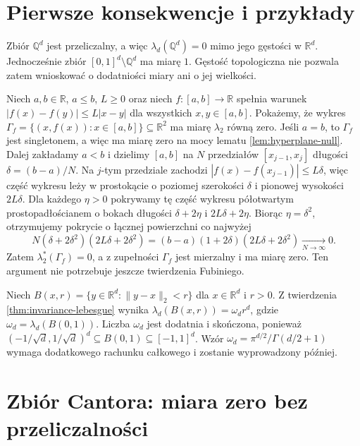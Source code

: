 \section{Pierwsze konsekwencje i przykłady}

\begin{przyklad}
Zbiór $\mathbb Q^d$ jest przeliczalny, a więc
$\lambda_d(\mathbb Q^d)=0$ mimo jego gęstości
w $\mathbb R^d$. Jednocześnie zbiór
$[0,1]^d\setminus\mathbb Q^d$ ma miarę $1$.
Gęstość topologiczna nie pozwala zatem wnioskować
o dodatniości miary ani o jej wielkości.
\end{przyklad}

\begin{przyklad}
\label{ex:lipschitz-graph-null}
Niech $a,b\in\mathbb R$, $a\le b$, $L\ge0$ oraz
niech $f:[a,b]\to\mathbb R$ spełnia warunek
$|f(x)-f(y)|\le L|x-y|$ dla wszystkich
$x,y\in[a,b]$.
Pokażemy, że wykres
$\Gamma_f=\{(x,f(x)):x\in[a,b]\}\subseteq\mathbb R^2$
ma miarę $\lambda_2$ równą zero.
Jeśli $a=b$, to $\Gamma_f$ jest singletonem, a więc
ma miarę zero na mocy lematu \ref{lem:hyperplane-null}.
Dalej zakładamy $a<b$ i dzielimy $[a,b]$ na $N$ przedziałów
$[x_{j-1},x_j]$ długości $\delta=(b-a)/N$.
Na $j$-tym przedziale zachodzi
$|f(x)-f(x_{j-1})|\le L\delta$, więc część wykresu
leży w prostokącie o poziomej szerokości $\delta$
i pionowej wysokości $2L\delta$.
Dla każdego $\eta>0$ pokrywamy tę część wykresu
półotwartym prostopadłościanem o bokach długości
$\delta+2\eta$ i $2L\delta+2\eta$.
Biorąc $\eta=\delta^2$, otrzymujemy pokrycie o
łącznej powierzchni co najwyżej
\[
N(\delta+2\delta^2)(2L\delta+2\delta^2)
=(b-a)(1+2\delta)(2L\delta+2\delta^2)
\xrightarrow[N\to\infty]{}0.
\]
Zatem $\lambda_2^*(\Gamma_f)=0$, a z zupełności
$\Gamma_f$ jest mierzalny i ma miarę zero.
Ten argument nie potrzebuje jeszcze twierdzenia Fubiniego.
\end{przyklad}

\begin{przyklad}
Niech $B(x,r)=\{y\in\mathbb R^d:\|y-x\|_2<r\}$
dla $x\in\mathbb R^d$ i $r>0$.
Z twierdzenia \ref{thm:invariance-lebesgue}
wynika $\lambda_d(B(x,r))=\omega_dr^d$,
gdzie $\omega_d=\lambda_d(B(0,1))$.
Liczba $\omega_d$ jest dodatnia i skończona, ponieważ
$(-1/\sqrt d,1/\sqrt d)^d\subseteq B(0,1)
\subseteq[-1,1]^d$. Wzór
$\omega_d=\pi^{d/2}/\Gamma(d/2+1)$ wymaga dodatkowego
rachunku całkowego i zostanie wyprowadzony później.
\end{przyklad}

\section{Zbiór Cantora: miara zero bez przeliczalności}

